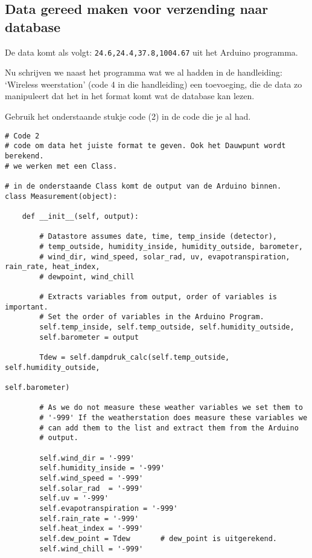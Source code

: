 \subsection{Data gereed maken voor verzending naar database}

De data komt als volgt: \verb|24.6,24.4,37.8,1004.67| uit het Arduino programma.

Nu schrijven we naast het programma wat we al hadden in de handleiding: `Wireless
weerstation' (code 4 in die handleiding) een toevoeging, die de data zo manipuleert dat het in het 
format komt wat de \hisparc database kan lezen.

Gebruik het onderstaande stukje code (2) in de code die je al had.

\begin{verbatim}
# Code 2
# code om data het juiste format te geven. Ook het Dauwpunt wordt berekend.
# we werken met een Class.

# in de onderstaande Class komt de output van de Arduino binnen.
class Measurement(object):

    def __init__(self, output):

        # Datastore assumes date, time, temp_inside (detector),
        # temp_outside, humidity_inside, humidity_outside, barometer,
        # wind_dir, wind_speed, solar_rad, uv, evapotranspiration, rain_rate, heat_index,
        # dewpoint, wind_chill

        # Extracts variables from output, order of variables is important.
        # Set the order of variables in the Arduino Program.
        self.temp_inside, self.temp_outside, self.humidity_outside, 
        self.barometer = output

        Tdew = self.dampdruk_calc(self.temp_outside, self.humidity_outside, 
                                                            self.barometer)

        # As we do not measure these weather variables we set them to
        # '-999' If the weatherstation does measure these variables we
        # can add them to the list and extract them from the Arduino
        # output.

        self.wind_dir = '-999'
        self.humidity_inside = '-999'
        self.wind_speed = '-999'
        self.solar_rad  = '-999'
        self.uv = '-999'
        self.evapotranspiration = '-999'
        self.rain_rate = '-999'
        self.heat_index = '-999'
        self.dew_point = Tdew       # dew_point is uitgerekend.
        self.wind_chill = '-999'


\end{verbatim}
